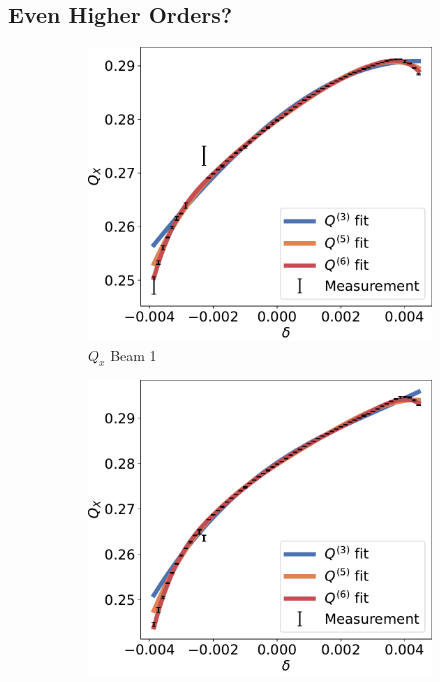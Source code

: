 \subsection{Even Higher Orders?}


\begin{figure}[!htb]
    \begin{subfigure}{0.49\textwidth}
        \centering
        \includegraphics[width=\textwidth]{./images/chromaticity_further/q6/Beam1_Qx.pdf}
        \caption{$Q_x$ Beam 1}
        \label{}
    \end{subfigure}
    \hfill
    \begin{subfigure}{0.49\textwidth}
        \centering
        \includegraphics[width=\textwidth]{./images/chromaticity_further/q6/Beam2_Qx.pdf}

\end{subfigure}
\end{figure}
